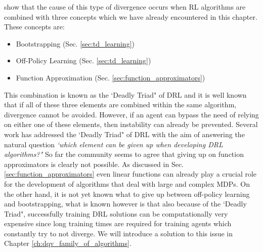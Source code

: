 \citet{sutton2018reinforcement} show that the cause of this type of divergence occurs when RL algorithms are combined with three concepts which we have already encountered in this chapter. These concepts are:
\begin{itemize}
	\item Bootstrapping (Sec. \ref{sec:td_learning})
	\item Off-Policy Learning (Sec. \ref{sec:td_learning})
	\item Function Approximation (Sec. \ref{sec:function_approximators})
\end{itemize}
This combination is known as the `Deadly Triad" of DRL and it is well known that if all of these three elements are combined within the same algorithm, divergence cannot be avoided. However, if an agent can bypass the need of relying on either one of these elements, then instability can already be prevented. Several work has addressed the `Deadly Triad" of DRL \cite{van2018deep_triad,hernandez2019understanding,fedus2020revisiting} with the aim of answering the natural question \textit{`which element can be given up when developing DRL algorithms?"} So far the community seems to agree that giving up on function approximators is clearly not possible. As discussed in Sec. \ref{sec:function_approximators} even linear functions can already play a crucial role for the development of algorithms that deal with large and complex MDPs. On the other hand, it is not yet known what to give up between off-policy learning and bootstrapping, what is known however is that also because of the `Deadly Triad", successfully training DRL solutions can be computationally very expensive since long training times are required for training agents which constantly try to not diverge. We will introduce a solution to this issue in Chapter \ref{ch:dqv_family_of_algorithms}.


